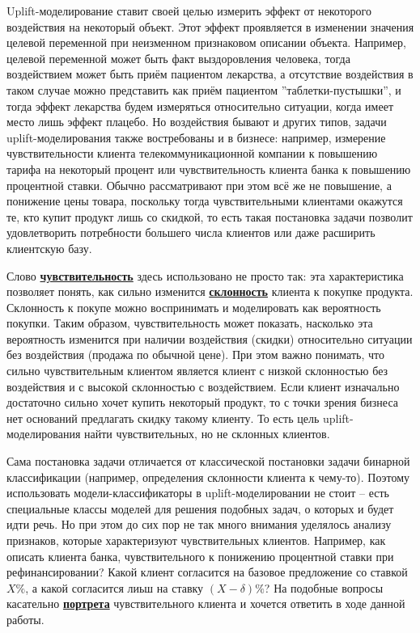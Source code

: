 \par
Uplift-моделирование ставит своей целью измерить эффект от некоторого воздействия на некоторый объект. Этот эффект проявляется в изменении значения целевой переменной при неизменном признаковом описании объекта. Например, целевой переменной может быть факт выздоровления человека, тогда воздействием может быть приём пациентом лекарства, а отсутствие воздействия в таком случае можно представить как приём пациентом ''таблетки-пустышки'', и тогда эффект лекарства будем измеряться относительно ситуации, когда имеет место лишь эффект плацебо. Но воздействия бывают и других типов, задачи uplift-моделирования также востребованы и в бизнесе: например, измерение чувствительности клиента телекоммуникационной компании к повышению тарифа на некоторый процент или чувствительность клиента банка к повышению процентной ставки. Обычно рассматривают при этом всё же не повышение, а понижение цены товара, поскольку тогда чувствительными клиентами окажутся те, кто купит продукт лишь со скидкой, то есть такая постановка задачи позволит удовлетворить потребности большего числа клиентов или даже расширить клиентскую базу.

\par
Слово \textbf{\underline{чувствительность}} здесь использовано не просто так: эта характеристика позволяет понять, как сильно изменится \textbf{\underline{склонность}} клиента к покупке продукта. Склонность к покупе можно воспринимать и моделировать как вероятность покупки. Таким образом, чувствительность может показать, насколько эта вероятность изменится при наличии воздействия (скидки) относительно ситуации без воздействия (продажа по обычной цене). При этом важно понимать, что сильно чувствительным клиентом является клиент с низкой склонностью без воздействия и с высокой склонностью с воздействием. Если клиент изначально достаточно сильно хочет купить некоторый продукт, то с точки зрения бизнеса нет оснований предлагать скидку такому клиенту. То есть цель uplift-моделирования найти чувствительных, но не склонных клиентов.

\par
Сама постановка задачи отличается от классической постановки задачи бинарной классификации (например, определения склонности клиента к чему-то). Поэтому использовать модели-классификаторы в uplift-моделировании не стоит -- есть специальные классы моделей для решения подобных задач, о которых и будет идти речь. Но при этом до сих пор не так много внимания уделялось анализу признаков, которые характеризуют чувствительных клиентов. Например, как описать клиента банка, чувствительного к понижению процентной ставки при рефинансировании? Какой клиент согласится на базовое предложение со ставкой $X\%$, а какой согласится лиьш на ставку $(X-\delta)\%$? На подобные вопросы касательно \textbf{\underline{портрета}} чувствительного клиента и хочется ответить в ходе данной работы.

